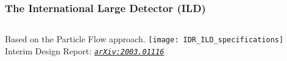 \begin{frame}
    \frametitle{The International Large Detector (ILD)}
    \begin{columns}[c,onlytextwidth]
    \begin{column}{0.5\textwidth}
    Based on the Particle Flow approach.
    \texttt{[image: IDR\_ILD\_specifications]}
    \vfill
    {\footnotesize
    Interim Design Report:
    \href{https://arxiv.org/abs/2003.01116}{\emph{\texttt{arXiv:2003.01116}}}
    }
    \end{column}
    \begin{column}{0.5\textwidth}
    \end{column}
    \end{columns}
    \end{frame}

